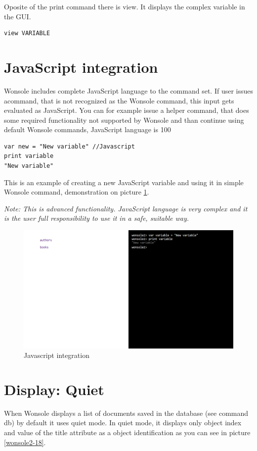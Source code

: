 Oposite of the print command there is view. It displays the complex variable in
the GUI.
\begin{verbatim}
view VARIABLE
\end{verbatim}

\section{JavaScript integration}
Wonsole includes complete JavaScript language to the command set. If user issues
acommand, that is not recognized as the Wonsole command, this input gets
evaluated as JavaScript. You can for example issue a helper command, that does
some required functionality not supported by Wonsole and than continue using
default Wonsole commands, JavaScript language is 100%

\begin{verbatim}
var new = "New variable" //Javascript
print variable
"New variable"
\end{verbatim}

This is an example of creating a new JavaScript variable and using it in simple
Wonsole command, demonstration on picture \ref{wonsole2-15}.

\textit{Note: This is advanced functionality. JavaScript language is very
complex and it is the user full responsibility to use it in a safe, suitable
way.}
 

\begin{figure}
\centering
\includegraphics[width=\textwidth]{../../manual/screenshot/wonsole2/wonsole2-15.png}
\caption{Javascript integration}
\label{wonsole2-15}
\end{figure}

\section{Display: Quiet}
When Wonsole displays a list of documents saved in the database (see command
db) by default it uses quiet mode. In quiet mode, it displays only object index and
value of the title attribute as a object identification as you can see in
picture \ref{wonsole2-18}.

